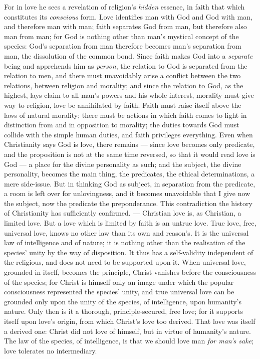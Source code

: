 \documentclass[12pt,a4paper]{book}
\begin{document}
For in love he sees a revelation of religion's \emph{hidden} essence, in faith
that which constitutes its \emph{conscious} form. Love identifies man with God
and God with man, and therefore man with man; faith separates God from man,
but therefore also man from man; for God is nothing other than man's mystical
concept of the species: God's separation from man therefore becomes man's
separation from man, the dissolution of the common bond. Since faith makes God
into a \emph{separate} being and apprehends him as \emph{person}, the relation
to God is separated from the relation to men, and there must unavoidably arise
a conflict between the two relations, between religion and morality; and since
the relation to God, as the highest, lays claim to all man's powers and his
whole interest, morality must give way to religion, love be annihilated by
faith. Faith must raise itself above the laws of natural morality; there must
be actions in which faith comes to light in distinction from and in opposition
to morality; the duties towards God must collide with the simple human duties,
and faith privileges everything. Even when Christianity says God is love,
there remains --- since love becomes only predicate, and the proposition is
not at the same time reversed, so that it would read love is God --- a place
for the divine personality as such; and the subject, the divine personality,
becomes the main thing, the predicates, the ethical determinations, a mere
side-issue. But in thinking God as subject, in separation from the predicate,
a room is left over for unlovingness, and it becomes unavoidable that I give
now the subject, now the predicate the preponderance. This contradiction the
history of Christianity has sufficiently confirmed. --- Christian love is, as
Christian, a limited love. But a love which is limited by faith is an untrue
love. True love, free, universal love, knows no other law than
its own and reason's. It is the universal law of intelligence and of nature;
it is nothing other than the realisation of the species' unity by the way of
disposition. It thus has a self-validity independent of the religious, and
does not need to be supported upon it. When universal love, grounded in
itself, becomes the principle, Christ vanishes before the consciousness of the
species; for Christ is himself only an image under which the popular
consciousness represented the species' unity, and true universal love can be
grounded only upon the unity of the species, of intelligence, upon humanity's
nature. Only then is it a thorough, principle-secured, free love; for it
supports itself upon love's origin, from which Christ's love too derived. That
love was itself a derived one: Christ did not love of himself, but in virtue
of humanity's nature. The law of the species, of intelligence, is that we
should love man \emph{for man's sake}; love tolerates no intermediary.
\end{document}

